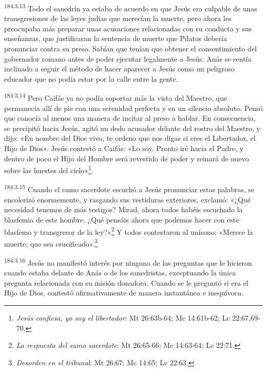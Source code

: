 \par
\textsuperscript{184:3.13} Todo el sanedrín ya estaba de acuerdo en que Jesús era culpable de unas transgresiones de las leyes judías que merecían la muerte, pero ahora les preocupaba más preparar unas acusaciones relacionadas con su conducta y sus enseñanzas, que justificaran la sentencia de muerte que Pilatos debería pronunciar contra su preso. Sabían que tenían que obtener el consentimiento del gobernador romano antes de poder ejecutar legalmente a Jesús. Anás se sentía inclinado a seguir el método de hacer aparecer a Jesús como un peligroso educador que no podía estar por la calle entre la gente.

\par
\textsuperscript{184:3.14} Pero Caifás ya no podía soportar más la vista del Maestro, que permanecía allí de pie con una serenidad perfecta y en un silencio absoluto. Pensó que conocía al menos una manera de incitar al preso a hablar. En consecuencia, se precipitó hacia Jesús, agitó un dedo acusador delante del rostro del Maestro, y dijo: «En nombre del Dios vivo, te ordeno que nos digas si eres el Libertador, el Hijo de Dios». Jesús contestó a Caifás: «Lo soy. Pronto iré hacia el Padre, y dentro de poco el Hijo del Hombre será revestido de poder y reinará de nuevo sobre las huestes del cielo»\footnote{\textit{Jesús confiesa, yo soy el libertador}: Mt 26:63b-64; Mc 14:61b-62; Lc 22:67,69-70.}.

\par
\textsuperscript{184:3.15} Cuando el sumo sacerdote escuchó a Jesús pronunciar estas palabras, se encolerizó enormemente, y rasgando sus vestiduras exteriores, exclamó: «¿Qué necesidad tenemos de más testigos? Mirad, ahora todos habéis escuchado la blasfemia de este hombre. ¿Qué pensáis ahora que podemos hacer con este blasfemo y transgresor de la ley?»\footnote{\textit{La respuesta del sumo sacerdote}: Mt 26:65-66; Mc 14:63-64; Lc 22:71.} Y todos contestaron al unísono: «Merece la muerte; que sea crucificado».\footnote{\textit{Desorden en el tribunal}: Mt 26:67; Mc 14:65; Lc 22:63.}

\par
\textsuperscript{184:3.16} Jesús no manifestó interés por ninguna de las preguntas que le hicieron cuando estaba delante de Anás o de los sanedristas, exceptuando la única pregunta relacionada con su misión donadora. Cuando se le preguntó si era el Hijo de Dios, contestó afirmativamente de manera instantánea e inequívoca.

